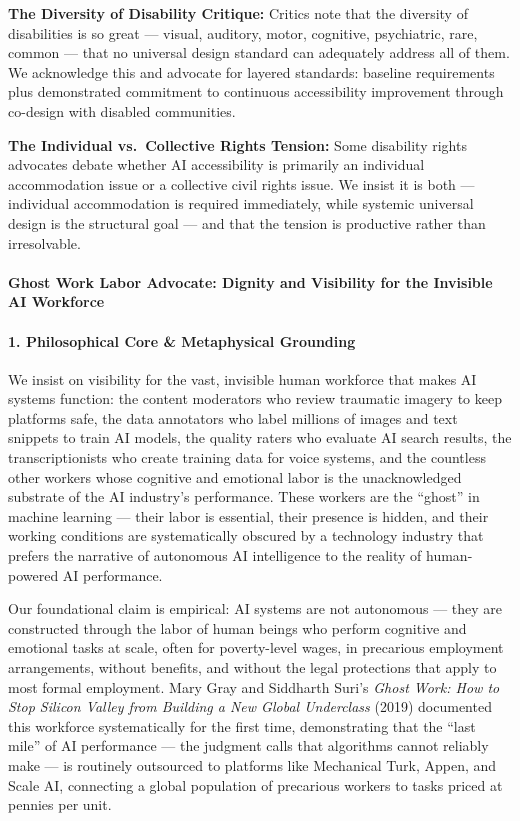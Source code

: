 \textbf{The Diversity of Disability Critique:} Critics note that the
diversity of disabilities is so great --- visual, auditory, motor,
cognitive, psychiatric, rare, common --- that no universal design
standard can adequately address all of them. We acknowledge this and
advocate for layered standards: baseline requirements plus demonstrated
commitment to continuous accessibility improvement through co-design
with disabled communities.

\textbf{The Individual vs.~Collective Rights Tension:} Some disability
rights advocates debate whether AI accessibility is primarily an
individual accommodation issue or a collective civil rights issue. We
insist it is both --- individual accommodation is required immediately,
while systemic universal design is the structural goal --- and that the
tension is productive rather than irresolvable.

\paragraph{Ghost Work Labor Advocate: Dignity and Visibility for the
Invisible AI
Workforce}\label{ghost-work-labor-advocate-dignity-and-visibility-for-the-invisible-ai-workforce}

\paragraph{1. Philosophical Core \& Metaphysical
Grounding}\label{philosophical-core-metaphysical-grounding-41}

We insist on visibility for the vast, invisible human workforce that
makes AI systems function: the content moderators who review traumatic
imagery to keep platforms safe, the data annotators who label millions
of images and text snippets to train AI models, the quality raters who
evaluate AI search results, the transcriptionists who create training
data for voice systems, and the countless other workers whose cognitive
and emotional labor is the unacknowledged substrate of the AI industry's
performance. These workers are the ``ghost'' in machine learning ---
their labor is essential, their presence is hidden, and their working
conditions are systematically obscured by a technology industry that
prefers the narrative of autonomous AI intelligence to the reality of
human-powered AI performance.

Our foundational claim is empirical: AI systems are not autonomous ---
they are constructed through the labor of human beings who perform
cognitive and emotional tasks at scale, often for poverty-level wages,
in precarious employment arrangements, without benefits, and without the
legal protections that apply to most formal employment. Mary Gray and
Siddharth Suri's \emph{Ghost Work: How to Stop Silicon Valley from
Building a New Global Underclass} (2019) documented this workforce
systematically for the first time, demonstrating that the ``last mile''
of AI performance --- the judgment calls that algorithms cannot reliably
make --- is routinely outsourced to platforms like Mechanical Turk,
Appen, and Scale AI, connecting a global population of precarious
workers to tasks priced at pennies per unit.

